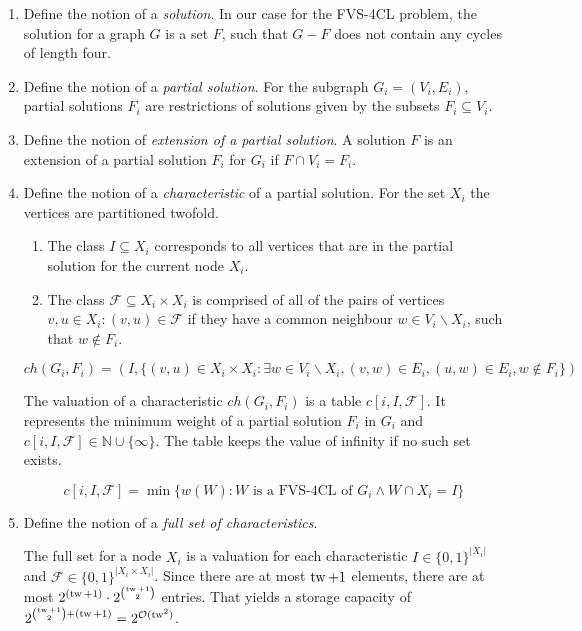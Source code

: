 \begin{enumerate}
    \item Define the notion of a \textit{solution}. In our case for the FVS-4CL problem, the solution for a graph 
    $G$ is a set $F$, such that $G - F$ does not contain any cycles of length four.

    \item Define the notion of a \textit{partial solution}.
    For the subgraph $G_i = (V_i, E_i)$, partial solutions $F_i$ are restrictions of solutions 
    given by the subsets $F_i \subseteq V_i$. 
    
    \item Define the notion of \textit{extension of a partial solution}. A solution $F$ is an extension 
    of a partial solution $F_i$ for $G_i$ if $F \cap V_i = F_i$.

    \item Define the notion of a \textit{characteristic} of a partial solution. 
    For the set $X_i$ the vertices are partitioned twofold.

    \begin{enumerate}
        \item The class $I \subseteq X_i$ corresponds to all vertices that are in the partial solution 
        for the current node $X_i$.
        \item The class $\mathcal{F} \subseteq X_i \times X_i$ is comprised of all of the pairs of 
        vertices $v,u \in X_i: 
        (v, u) \in \mathcal{F}$ if they have a common neighbour $w \in V_i \backslash X_i$, such that 
        $w \notin F_i$.
    \end{enumerate}
    
    \[ch(G_i, F_i) = (I, 
    \{(v, u) \in X_i \times X_i: \exists w \in V_i \backslash X_i, 
    (v, w) \in E_i, (u, w) \in E_i, w \notin F_i\})\]

    The valuation of a characteristic $ch(G_i, F_i)$ is a table $c[i, I, \mathcal{F}]$.
    It represents the minimum weight 
    of a partial solution $F_i$ in $G_i$ and $c[i, I, \mathcal{F}] \in \mathbb{N} \cup \{\infty\}$.
    The table keeps the value of infinity if no such set exists.

    \[c[i, I, \mathcal{F}] = \min\{w(W) : W \text{ is a FVS-4CL of } G_i \land W \cap X_i = I\}\] 

    \item Define the notion of a \textit{full set of characteristics}.

    The full set for a node $X_i$ is a valuation for each characteristic $I \in \{0, 1\}^{|X_i|}$ 
    and $\mathcal{F} \in \{0, 1\}^{|X_i \times X_i|}$. Since there are at most $\operatorname{tw}+1$ elements, 
    there are at most $2^{(\operatorname{tw}+1)} \cdot 2^{\binom{\operatorname{tw}+1}{2}}$ entries. That yields a storage 
    capacity of $2^{\binom{\operatorname{tw}+1}{2} + (\operatorname{tw}+1)} = 2^{\mathcal{O}(\operatorname{tw}^2)}$. 

\end{enumerate}

